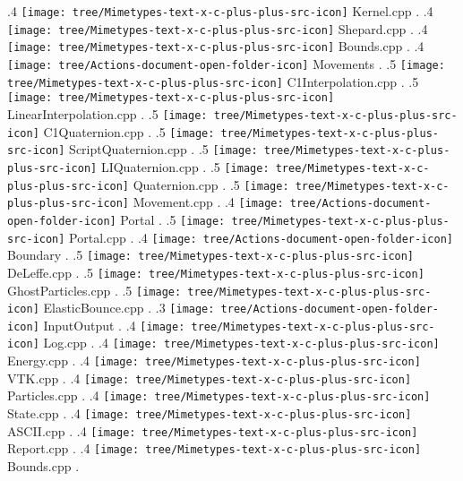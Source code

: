 {.4 { \texttt{[image: tree/Mimetypes-text-x-c-plus-plus-src-icon]} Kernel.cpp }.
.4 { \texttt{[image: tree/Mimetypes-text-x-c-plus-plus-src-icon]} Shepard.cpp }.
.4 { \texttt{[image: tree/Mimetypes-text-x-c-plus-plus-src-icon]} Bounds.cpp }.
.4 { \texttt{[image: tree/Actions-document-open-folder-icon]} Movements }.
.5 { \texttt{[image: tree/Mimetypes-text-x-c-plus-plus-src-icon]} C1Interpolation.cpp }.
.5 { \texttt{[image: tree/Mimetypes-text-x-c-plus-plus-src-icon]} LinearInterpolation.cpp }.
.5 { \texttt{[image: tree/Mimetypes-text-x-c-plus-plus-src-icon]} C1Quaternion.cpp }.
.5 { \texttt{[image: tree/Mimetypes-text-x-c-plus-plus-src-icon]} ScriptQuaternion.cpp }.
.5 { \texttt{[image: tree/Mimetypes-text-x-c-plus-plus-src-icon]} LIQuaternion.cpp }.
.5 { \texttt{[image: tree/Mimetypes-text-x-c-plus-plus-src-icon]} Quaternion.cpp }.
.5 { \texttt{[image: tree/Mimetypes-text-x-c-plus-plus-src-icon]} Movement.cpp }.
.4 { \texttt{[image: tree/Actions-document-open-folder-icon]} Portal }.
.5 { \texttt{[image: tree/Mimetypes-text-x-c-plus-plus-src-icon]} Portal.cpp }.
.4 { \texttt{[image: tree/Actions-document-open-folder-icon]} Boundary }.
.5 { \texttt{[image: tree/Mimetypes-text-x-c-plus-plus-src-icon]} DeLeffe.cpp }.
.5 { \texttt{[image: tree/Mimetypes-text-x-c-plus-plus-src-icon]} GhostParticles.cpp }.
.5 { \texttt{[image: tree/Mimetypes-text-x-c-plus-plus-src-icon]} ElasticBounce.cpp }.
.3 { \texttt{[image: tree/Actions-document-open-folder-icon]} InputOutput }.
.4 { \texttt{[image: tree/Mimetypes-text-x-c-plus-plus-src-icon]} Log.cpp }.
.4 { \texttt{[image: tree/Mimetypes-text-x-c-plus-plus-src-icon]} Energy.cpp }.
.4 { \texttt{[image: tree/Mimetypes-text-x-c-plus-plus-src-icon]} VTK.cpp }.
.4 { \texttt{[image: tree/Mimetypes-text-x-c-plus-plus-src-icon]} Particles.cpp }.
.4 { \texttt{[image: tree/Mimetypes-text-x-c-plus-plus-src-icon]} State.cpp }.
.4 { \texttt{[image: tree/Mimetypes-text-x-c-plus-plus-src-icon]} ASCII.cpp }.
.4 { \texttt{[image: tree/Mimetypes-text-x-c-plus-plus-src-icon]} Report.cpp }.
.4 { \texttt{[image: tree/Mimetypes-text-x-c-plus-plus-src-icon]} Bounds.cpp }.
}

